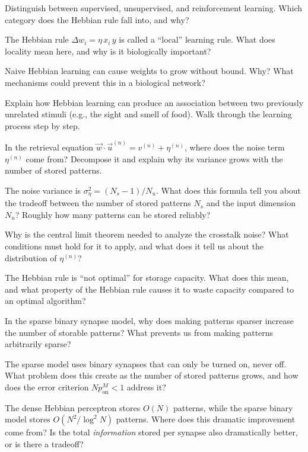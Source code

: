 \begin{conceptquestions}
  \item Distinguish between supervised, unsupervised, and reinforcement learning. Which category does the Hebbian rule fall into, and why?

  \item The Hebbian rule $\Delta w_i = \eta\, x_i\, y$ is called a ``local'' learning rule. What does locality mean here, and why is it biologically important?

  \item Naive Hebbian learning can cause weights to grow without bound. Why? What mechanisms could prevent this in a biological network?

  \item Explain how Hebbian learning can produce an association between two previously unrelated stimuli (e.g., the sight and smell of food). Walk through the learning process step by step.

  \item In the retrieval equation $\vec{w} \cdot \vec{u}^{(n)} = v^{(n)} + \eta^{(n)}$, where does the noise term $\eta^{(n)}$ come from? Decompose it and explain why its variance grows with the number of stored patterns.

  \item The noise variance is $\sigma_\eta^2 = (N_s - 1)/N_u$. What does this formula tell you about the tradeoff between the number of stored patterns $N_s$ and the input dimension $N_u$? Roughly how many patterns can be stored reliably?

  \item Why is the central limit theorem needed to analyze the crosstalk noise? What conditions must hold for it to apply, and what does it tell us about the distribution of $\eta^{(n)}$?

  \item The Hebbian rule is ``not optimal'' for storage capacity. What does this mean, and what property of the Hebbian rule causes it to waste capacity compared to an optimal algorithm?

  \item In the sparse binary synapse model, why does making patterns sparser increase the number of storable patterns? What prevents us from making patterns arbitrarily sparse?

  \item The sparse model uses binary synapses that can only be turned on, never off. What problem does this create as the number of stored patterns grows, and how does the error criterion $Np_{\text{on}}^M < 1$ address it?

  \item The dense Hebbian perceptron stores $O(N)$ patterns, while the sparse binary model stores $O(N^2/\log^2 N)$ patterns. Where does this dramatic improvement come from? Is the total \emph{information} stored per synapse also dramatically better, or is there a tradeoff?
\end{conceptquestions}
